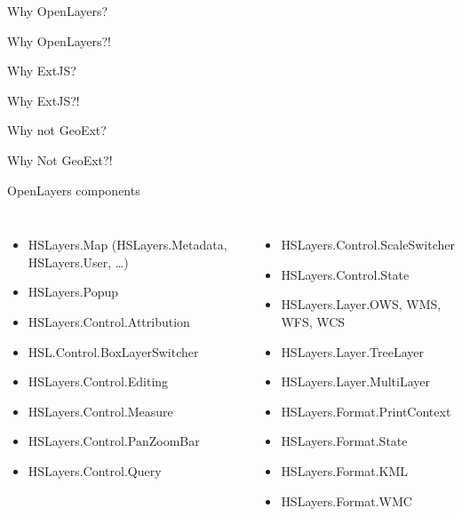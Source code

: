 \documentclass[xcolor=dvipsnames]{beamer}
\begin{document}
\begin{frame}{Why OpenLayers?}
\begin{center}
    Why OpenLayers?!
\end{center}
\end{frame}

\begin{frame}{Why ExtJS?}
\begin{center}
    Why ExtJS?!
\end{center}
\end{frame}

\begin{frame}{Why not GeoExt?}
\begin{center}
    Why Not GeoExt?!
\end{center}
\end{frame}

\begin{frame}{OpenLayers components}
\scriptsize
\begin{columns}
\begin{itemize}
    \item HSLayers.Map (HSLayers.Metadata, HSLayers.User, \dots)
    \item HSLayers.Popup
    \item HSLayers.Control.Attribution
    \item HSL.Control.BoxLayerSwitcher
    \item HSLayers.Control.Editing
    \item HSLayers.Control.Measure
    \item HSLayers.Control.PanZoomBar
    \item HSLayers.Control.Query
\end{itemize} 
\begin{itemize}
    \item HSLayers.Control.ScaleSwitcher
    \item HSLayers.Control.State
    \item HSLayers.Layer.OWS, WMS, WFS, WCS
    \item HSLayers.Layer.TreeLayer
    \item HSLayers.Layer.MultiLayer
    \item HSLayers.Format.PrintContext
    \item HSLayers.Format.State
    \item HSLayers.Format.KML
    \item HSLayers.Format.WMC
\end{itemize}
\end{columns}
\end{frame}
\end{document}
